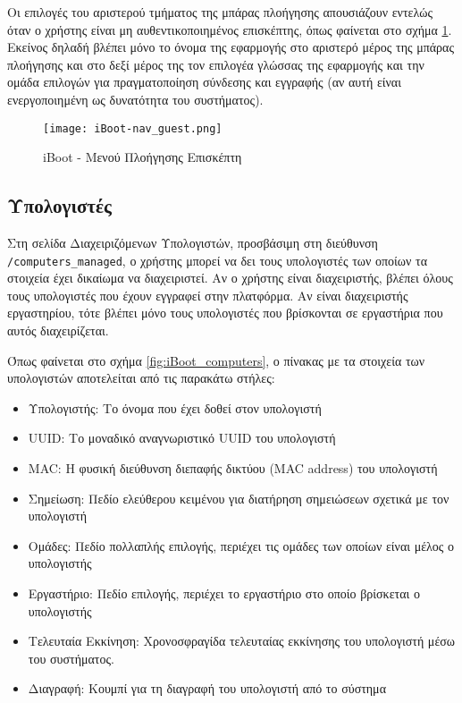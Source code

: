 Οι επιλογές του αριστερού τμήματος της μπάρας πλοήγησης απουσιάζουν εντελώς όταν ο χρήστης είναι μη αυθεντικοποιημένος επισκέπτης, όπως φαίνεται στο σχήμα \ref{fig:iBoot_nav_guest}. Εκείνος δηλαδή βλέπει μόνο το όνομα της εφαρμογής στο αριστερό μέρος της μπάρας πλοήγησης και στο δεξί μέρος της τον επιλογέα γλώσσας της εφαρμογής και την ομάδα επιλογών για πραγματοποίηση σύνδεσης και εγγραφής (αν αυτή είναι ενεργοποιημένη ως δυνατότητα του συστήματος).
\begin{figure}[ht]
	\centering
	\texttt{[image: iBoot-nav\_guest.png]}
	\caption{iBoot - Μενού Πλοήγησης Επισκέπτη}
	\label{fig:iBoot_nav_guest}
\end{figure}
\FloatBarrier

\subsection{Υπολογιστές}
\FloatBarrier
Στη σελίδα Διαχειριζόμενων Υπολογιστών, προσβάσιμη στη διεύθυνση \verb!/computers_managed!, ο χρήστης μπορεί να δει τους υπολογιστές των οποίων τα στοιχεία έχει δικαίωμα να διαχειριστεί. Αν ο χρήστης είναι διαχειριστής, βλέπει όλους τους υπολογιστές που έχουν εγγραφεί στην πλατφόρμα. Αν είναι διαχειριστής εργαστηρίου, τότε βλέπει μόνο τους υπολογιστές που βρίσκονται σε εργαστήρια που αυτός διαχειρίζεται.

Όπως φαίνεται στο σχήμα \ref{fig:iBoot_computers}, ο πίνακας με τα στοιχεία των υπολογιστών αποτελείται από τις παρακάτω στήλες:
\begin{itemize}
	\item Υπολογιστής: Το όνομα που έχει δοθεί στον υπολογιστή
	\item UUID: Το μοναδικό αναγνωριστικό UUID του υπολογιστή
	\item MAC: Η φυσική διεύθυνση διεπαφής δικτύου (MAC address) του υπολογιστή
	\item Σημείωση: Πεδίο ελεύθερου κειμένου για διατήρηση σημειώσεων σχετικά με τον υπολογιστή
	\item Ομάδες: Πεδίο πολλαπλής επιλογής, περιέχει τις ομάδες των οποίων είναι μέλος ο υπολογιστής
	\item Εργαστήριο: Πεδίο επιλογής, περιέχει το εργαστήριο στο οποίο βρίσκεται ο υπολογιστής
	\item Τελευταία Εκκίνηση: Χρονοσφραγίδα τελευταίας εκκίνησης του υπολογιστή μέσω του συστήματος.
	\item Διαγραφή: Κουμπί για τη διαγραφή του υπολογιστή από το σύστημα
\end{itemize}

